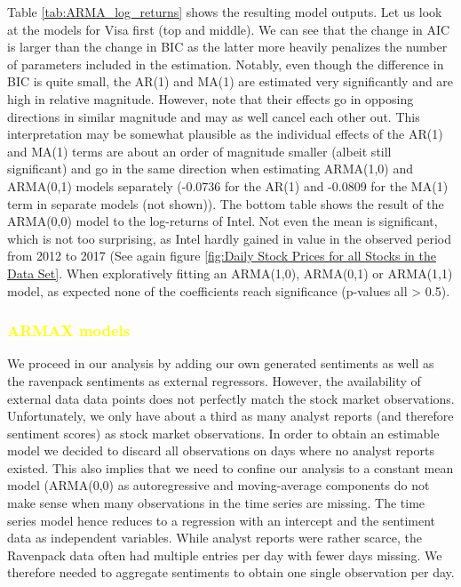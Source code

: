 Table \ref{tab:ARMA_log_returns} shows the resulting model outputs. Let us look at the models for Visa first (top and middle). We can see that the change in AIC is larger than the change in BIC as the latter more heavily penalizes the number of parameters included in the estimation. Notably, even though the difference in BIC is quite small, the AR(1) and MA(1) are estimated very significantly and are high in relative magnitude. However, note that their effects go in opposing directions in similar magnitude and may as well cancel each other out. This interpretation may be somewhat plausible as the individual effects of the AR(1) and MA(1) terms are about an order of magnitude smaller (albeit still significant) and go in the same direction when estimating ARMA(1,0) and ARMA(0,1) models separately (-0.0736 for the AR(1) and -0.0809 for the MA(1) term in separate models (not shown)). 
The bottom table shows the result of the ARMA(0,0) model to the log-returns of Intel. Not even the mean is significant, which is not too surprising, as Intel hardly gained in value in the observed period from 2012 to 2017 (See again figure \ref{fig:Daily Stock Prices for all Stocks in the Data Set}. When exploratively fitting an ARMA(1,0), ARMA(0,1) or ARMA(1,1) model, as expected none of the coefficients reach significance (p-values all > 0.5). 

\subsubsection{\textcolor{yellow}{ARMAX models}}
We proceed in our analysis by adding our own generated sentiments as well as the ravenpack sentiments as external regressors. However, the availability of external data data points does not perfectly match the stock market observations. Unfortunately, we only have about a third as many analyst reports (and therefore sentiment scores) as stock market observations. In order to obtain an estimable model we decided to discard all observations on days where no analyst reports existed. This also implies that we need to confine our analysis to a constant mean model (ARMA(0,0) as autoregressive and moving-average components do not make sense when many observations in the time series are missing. The time series model hence reduces to a regression with an intercept and the sentiment data as independent variables. While analyst reports were rather scarce, the Ravenpack data often had multiple entries per day with fewer days missing. We therefore needed to aggregate sentiments to obtain one single observation per day. 

